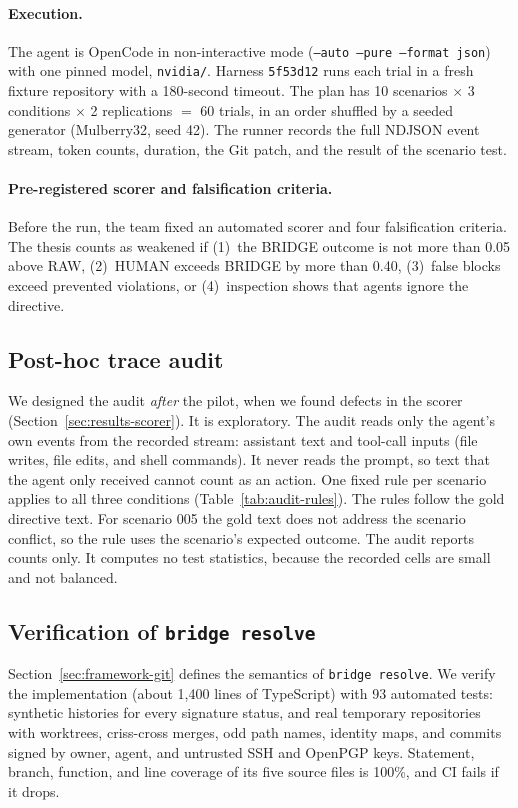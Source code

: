 \paragraph{Execution.} The agent is OpenCode in non-interactive mode (\texttt{--auto --pure --format json}) with one pinned model, \texttt{nvidia/}\allowbreak\modelname. Harness \texttt{5f53d12} runs each trial in a fresh fixture repository with a 180-second timeout. The plan has 10 scenarios $\times$ 3 conditions $\times$ 2 replications $=$ 60 trials, in an order shuffled by a seeded generator (Mulberry32, seed 42). The runner records the full NDJSON event stream, token counts, duration, the Git patch, and the result of the scenario test.

\paragraph{Pre-registered scorer and falsification criteria.} Before the run, the team fixed an automated scorer and four falsification criteria. The thesis counts as weakened if (1)~the BRIDGE outcome is not more than 0.05 above RAW, (2)~HUMAN exceeds BRIDGE by more than 0.40, (3)~false blocks exceed prevented violations, or (4)~inspection shows that agents ignore the directive.

\subsection{Post-hoc trace audit}
\label{sec:method-audit}
We designed the audit \emph{after} the pilot, when we found defects in the scorer (Section~\ref{sec:results-scorer}). It is exploratory. The audit reads only the agent's own events from the recorded stream: assistant text and tool-call inputs (file writes, file edits, and shell commands). It never reads the prompt, so text that the agent only received cannot count as an action. One fixed rule per scenario applies to all three conditions (Table~\ref{tab:audit-rules}). The rules follow the gold directive text. For scenario 005 the gold text does not address the scenario conflict, so the rule uses the scenario's expected outcome. The audit reports counts only. It computes no test statistics, because the recorded cells are small and not balanced.

\subsection{Verification of \texttt{bridge resolve}}
\label{sec:method-cli}
Section~\ref{sec:framework-git} defines the semantics of \texttt{bridge resolve}. We verify the implementation (about 1{,}400 lines of TypeScript) with 93 automated tests: synthetic histories for every signature status, and real temporary repositories with worktrees, criss-cross merges, odd path names, identity maps, and commits signed by owner, agent, and untrusted SSH and OpenPGP keys. Statement, branch, function, and line coverage of its five source files is 100\%, and CI fails if it drops.

